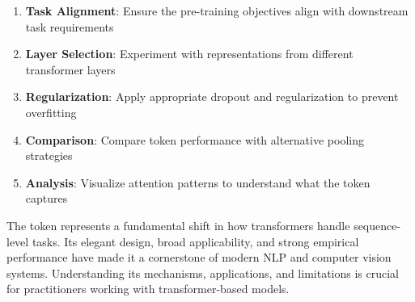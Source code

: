 \begin{principle}
\begin{enumerate}
\item \textbf{Task Alignment}: Ensure the pre-training objectives align with downstream task requirements
\item \textbf{Layer Selection}: Experiment with \cls{} representations from different transformer layers
\item \textbf{Regularization}: Apply appropriate dropout and regularization to prevent overfitting
\item \textbf{Comparison}: Compare \cls{} token performance with alternative pooling strategies
\item \textbf{Analysis}: Visualize attention patterns to understand what the \cls{} token captures
\end{enumerate}
\end{principle}

The \cls{} token represents a fundamental shift in how transformers handle sequence-level tasks. Its elegant design, broad applicability, and strong empirical performance have made it a cornerstone of modern NLP and computer vision systems. Understanding its mechanisms, applications, and limitations is crucial for practitioners working with transformer-based models.